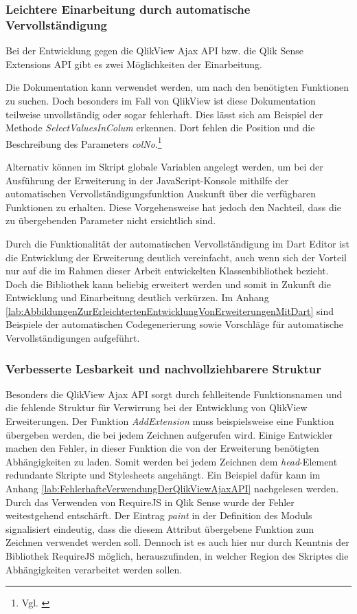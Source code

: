 \subsubsection{Leichtere Einarbeitung durch automatische Vervollständigung}


Bei der Entwicklung gegen die QlikView Ajax API bzw. die Qlik Sense Extensions API gibt es zwei Möglich\-keiten der Einarbeitung.

Die Dokumentation kann verwendet werden, um nach den benötigten Funktionen zu suchen. Doch besonders im Fall von QlikView ist diese Dokumentation teilweise unvollständig oder sogar fehlerhaft. Dies lässt sich am Beispiel der Methode \textit{SelectValuesInColum} erkennen. Dort fehlen die Position und die Beschreibung des Parameters \textit{colNo}.\footnote{Vgl. \cite{JsDocReferenceQvDocumentObjectDataSelectValuesInColumn}}

Alternativ können im Skript globale Variablen angelegt werden, um bei der Ausführung der Erweiterung in der JavaScript-Konsole mithilfe der automatischen Vervollständigungsfunktion Auskunft über die verfügbaren Funktionen zu erhalten. Diese Vorgehensweise hat jedoch den Nachteil, dass die zu übergebenden Parameter nicht ersichtlich sind. 

Durch die Funktionalität der automatischen Vervollständigung im Dart Editor ist die Entwicklung der Erweiterung deutlich vereinfacht, auch wenn sich der Vorteil nur auf die im Rahmen dieser Arbeit entwickelten Klassen\-bibliothek bezieht. Doch die Bibliothek kann beliebig erweitert werden und somit in Zukunft die Entwicklung und Einarbeitung deutlich verkürzen. Im Anhang \ref{lab:AbbildungenZurErleichtertenEntwicklungVonErweiterungenMitDart} sind Beispiele der automatischen Codegenerierung sowie Vorschläge für automatische Vervollständigungen aufgeführt.

\subsubsection{Verbesserte Lesbarkeit und nachvollziehbarere Struktur}


Besonders die QlikView Ajax API sorgt durch fehlleitende Funktionsnamen und die fehlende Struktur für Verwirrung bei der Entwicklung von QlikView Erweiterungen. Der Funktion \textit{AddExtension} muss beispielsweise eine Funktion übergeben werden, die bei jedem Zeichnen aufgerufen wird. Einige Entwickler machen den Fehler, in dieser Funktion die von der Erweiterung benötigten Abhängig\-keiten zu laden. Somit werden bei jedem Zeichnen dem \textit{head}-Element redundante Skripte und Stylesheets angehängt. Ein Beispiel dafür kann im Anhang \ref{lab:FehlerhafteVerwendungDerQlikViewAjaxAPI} nachgelesen werden. Durch das Verwenden von RequireJS in Qlik Sense wurde der Fehler weitestgehend entschärft. Der Eintrag \textit{paint} in der Definition des Moduls signalisiert eindeutig, dass die diesem Attribut übergebene Funktion zum Zeichnen verwendet werden soll. Dennoch ist es auch hier nur durch Kenntnis der Bibliothek RequireJS möglich, herauszufinden, in welcher Region des Skriptes die Abhängig\-keiten verarbeitet werden sollen.

